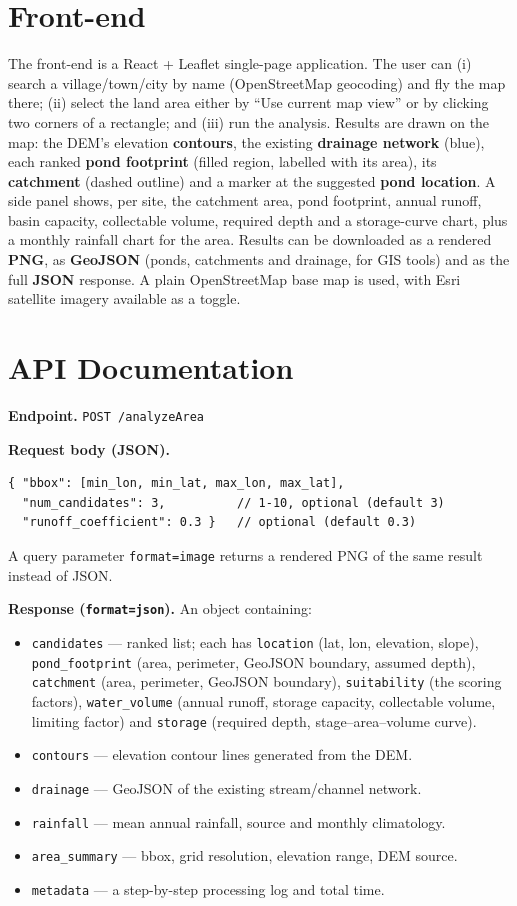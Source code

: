 \documentclass[11pt]{article}
\begin{document}
\section{Front-end}

The front-end is a React + Leaflet single-page application. The user can (i) search a
village/town/city by name (OpenStreetMap geocoding) and fly the map there; (ii) select
the land area either by ``Use current map view'' or by clicking two corners of a
rectangle; and (iii) run the analysis. Results are drawn on the map: the DEM's
elevation \textbf{contours}, the existing \textbf{drainage network} (blue), each
ranked \textbf{pond footprint} (filled region, labelled with its area), its
\textbf{catchment} (dashed outline) and a marker at the suggested \textbf{pond
location}. A side panel shows, per site, the catchment area, pond footprint, annual
runoff, basin capacity, collectable volume, required depth and a storage-curve chart,
plus a monthly rainfall chart for the area. Results can be downloaded as a rendered
\textbf{PNG}, as \textbf{GeoJSON} (ponds, catchments and drainage, for GIS tools) and
as the full \textbf{JSON} response. A plain OpenStreetMap base map is used, with Esri
satellite imagery available as a toggle.

\section{API Documentation}

\textbf{Endpoint.} \texttt{POST /analyzeArea}

\textbf{Request body (JSON).}
\begin{lstlisting}
{ "bbox": [min_lon, min_lat, max_lon, max_lat],
  "num_candidates": 3,          // 1-10, optional (default 3)
  "runoff_coefficient": 0.3 }   // optional (default 0.3)
\end{lstlisting}
A query parameter \texttt{format=image} returns a rendered PNG of the same result
instead of JSON.

\textbf{Response (\texttt{format=json}).} An object containing:
\begin{itemize}[nosep,leftmargin=1.4em]
  \item \texttt{candidates} --- ranked list; each has \texttt{location} (lat, lon,
  elevation, slope), \texttt{pond\_footprint} (area, perimeter, GeoJSON boundary,
  assumed depth), \texttt{catchment} (area, perimeter, GeoJSON boundary),
  \texttt{suitability} (the scoring factors), \texttt{water\_volume} (annual runoff,
  storage capacity, collectable volume, limiting factor) and \texttt{storage}
  (required depth, stage--area--volume curve).
  \item \texttt{contours} --- elevation contour lines generated from the DEM.
  \item \texttt{drainage} --- GeoJSON of the existing stream/channel network.
  \item \texttt{rainfall} --- mean annual rainfall, source and monthly climatology.
  \item \texttt{area\_summary} --- bbox, grid resolution, elevation range, DEM source.
  \item \texttt{metadata} --- a step-by-step processing log and total time.
\end{itemize}
\end{document}
